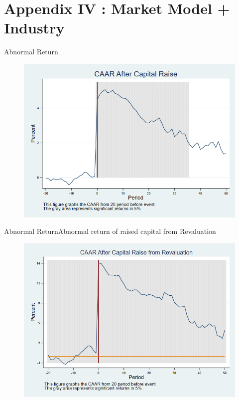 \documentclass{beamer}
\begin{document}
	
	\section{Appendix IV : Market Model + Industry }
	
	
	\begin{frame}{Abnormal Return}
		\label{car_marketmodel_industry}
		\begin{figure}
			\centering
			\includegraphics[width=0.7\linewidth]{Output/car_marketmodel_industry.png}
			\label{fig:car_marketmodel_industry}
		\end{figure}
	\end{frame}
	
	\begin{frame}{Abnormal Return}{Abnormal return of raised capital from Revaluation}
		\label{car_marketmodel_industryRevaluation}
		\begin{figure}
			\centering
			\includegraphics[width=0.65\linewidth]{Output/car_marketmodel_industryRevaluation.png}
			\label{fig:car_marketmodel_industryRevaluation}
		\end{figure}
	\end{frame}
	
\end{document}
